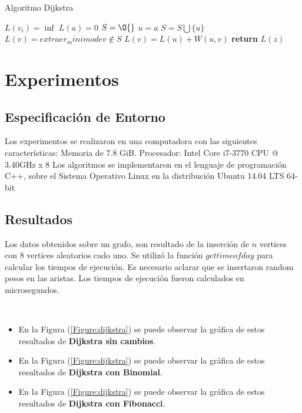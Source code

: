 \documentclass[a4paper,twocolumn,10pt]{article}
\begin{document}
\begin{algorithm}
\caption{Algoritmo Dijkstra}\label{alg:dijkstra_con_heap}
\begin{algorithmic}
      \State $L(v_i)=\inf$ 
      \EndFor
    \State $L(a)=0$
    \State $S=\O{}$
     
      \State $u=a$  
      \State $S=S \bigcup \{u\}$
      \State $L(v)=extraer_minimo de v \notin S $ 
	    \State $L(v)=L(u)+W(u,v)$
	 \EndIf
    \EndWhile 
    \State \textbf{return} $L(z)$
\EndProcedure 
\end{algorithmic}
\end{algorithm}


\section{Experimentos}
\subsection{Especificación de Entorno}
Los experimentos se realizaron en una computadora con las siguientes características: Memoria de 7.8 GiB. 
Procesador: Intel Core i7-3770 CPU  @ 3.40GHz x 8
\newline
Los algoritmos se implementaron en el lenguaje de programación C++, sobre el Sistema Operativo Linux en la distribución Ubuntu 14.04 LTS 64-bit
\subsection{Resultados}
Los datos obtenidos sobre un grafo, son resultado de la inserción de $n$ vertices con 8 vertices aleatorios cado uno. 
Se utilizó la función $gettimeofday$ para calcular los tiempos de ejecución. 
Es necesario aclarar que se insertaron random pesos en las aristas. 
Los tiempos de ejecución fueron calculados en microsegundos.

~\newline
\begin{itemize}
 \item En la Figura (\ref{Figure:dijkstra}) se puede observar la gráfica de estos resultados de \textbf{Dijkstra sin cambios}.
 \item En la Figura (\ref{Figure:dijkstra}) se puede observar la gráfica de estos resultados de \textbf{Dijkstra con Binomial}.
 \item En la Figura (\ref{Figure:dijkstra}) se puede observar la gráfica de estos resultados de \textbf{Dijkstra con Fibonacci}.
\end{itemize}
\end{document}

